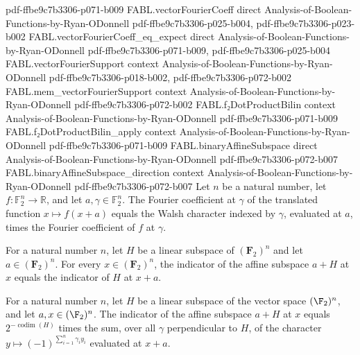 \begin{theorem}
  {pdf-ffbe9c7b3306-p071-b009}
\proofstep
  {FABL.vectorFourierCoeff}
  {direct}
  {Analysis-of-Boolean-Functions-by-Ryan-ODonnell}
  {pdf-ffbe9c7b3306-p025-b004,
    pdf-ffbe9c7b3306-p023-b002}
\proofstep
  {FABL.vectorFourierCoeff_eq_expect}
  {direct}
  {Analysis-of-Boolean-Functions-by-Ryan-ODonnell}
  {pdf-ffbe9c7b3306-p071-b009,
    pdf-ffbe9c7b3306-p025-b004}
\proofstep
  {FABL.vectorFourierSupport}
  {context}
  {Analysis-of-Boolean-Functions-by-Ryan-ODonnell}
  {pdf-ffbe9c7b3306-p018-b002,
    pdf-ffbe9c7b3306-p072-b002}
\proofstep
  {FABL.mem_vectorFourierSupport}
  {context}
  {Analysis-of-Boolean-Functions-by-Ryan-ODonnell}
  {pdf-ffbe9c7b3306-p072-b002}
\proofstep
  {FABL.f₂DotProductBilin}
  {context}
  {Analysis-of-Boolean-Functions-by-Ryan-ODonnell}
  {pdf-ffbe9c7b3306-p071-b009}
\proofstep
  {FABL.f₂DotProductBilin_apply}
  {context}
  {Analysis-of-Boolean-Functions-by-Ryan-ODonnell}
  {pdf-ffbe9c7b3306-p071-b009}
\proofstep
  {FABL.binaryAffineSubspace}
  {direct}
  {Analysis-of-Boolean-Functions-by-Ryan-ODonnell}
  {pdf-ffbe9c7b3306-p072-b007}
\proofstep
  {FABL.binaryAffineSubspace_direction}
  {context}
  {Analysis-of-Boolean-Functions-by-Ryan-ODonnell}
  {pdf-ffbe9c7b3306-p072-b007}
Let $n$ be a natural number, let $f:\mathbb{F}_2^n\to\mathbb{R}$, and let
$a,\gamma\in\mathbb{F}_2^n$. The Fourier coefficient at $\gamma$ of the translated
function $x\mapsto f(x+a)$ equals the Walsh character indexed by $\gamma$, evaluated at
$a$, times the Fourier coefficient of $f$ at $\gamma$.
\end{theorem}

\begin{theorem}
\label{FABL.setIndicator_binaryAffineSubspace_eq_translate}
\leanok
{}
For a natural number $n$, let $H$ be a linear subspace of $(\mathbf F_2)^n$ and let
$a\in(\mathbf F_2)^n$. For every $x\in(\mathbf F_2)^n$, the indicator of the affine
subspace $a+H$ at $x$ equals the indicator of $H$ at $x+a$.
\end{theorem}

\begin{theorem}
\label{FABL.setIndicator_binaryAffineSubspace_apply}
\leanok
{}
For a natural number $n$, let $H$ be a linear subspace of the vector space $(\F_2)^n$,
and let $a,x\in(\F_2)^n$. The indicator of the affine subspace $a+H$ at $x$ equals
$2^{-\operatorname{codim}(H)}$ times the sum, over all $\gamma$ perpendicular to $H$, of
the character $y\mapsto(-1)^{\sum_{i=1}^n\gamma_i y_i}$ evaluated at $x+a$.
\end{theorem}

